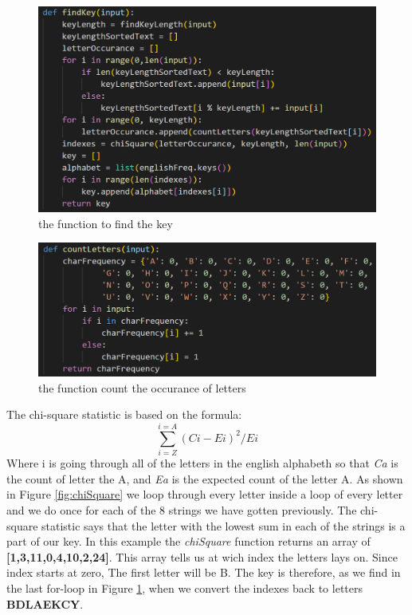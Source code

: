 \documentclass[12pt, letterpaper]{article}
\begin{document}
\begin{figure}
  \includegraphics[width=\linewidth]{code_snippets/findKey.PNG}
  \caption{the function to find the key}
  \label{fig:findKey}
\end{figure}
\begin{figure}
  \includegraphics[width=\linewidth]{code_snippets/countLetters.PNG}
  \caption{the function count the occurance of letters}
  \label{fig:countLetters}
\end{figure}

The chi-square statistic is based on the formula: 
$$\sum_{i = Z}^{i = A} (Ci - Ei)^{2}/Ei $$
Where i is going through all of the letters in the english alphabeth so that \textit{Ca} is the count of letter the A, and \textit{Ea} is the expected count of the letter A. As shown in Figure \ref{fig:chiSquare} we loop through every letter inside a loop of every letter and we do once for each of the 8 strings we have gotten previously. The chi-square statistic says that the letter with the lowest sum in each of the strings is a part of our key. In this example the \textit{chiSquare} function returns an array of \textbf{[1,3,11,0,4,10,2,24]}. This array tells us at wich index the letters lays on. Since index starts at zero, The first letter will be B. The key is therefore, as we find in the last for-loop in Figure \ref{fig:findKey}, when we convert the indexes back to letters \textbf{BDLAEKCY}.
\end{document}
